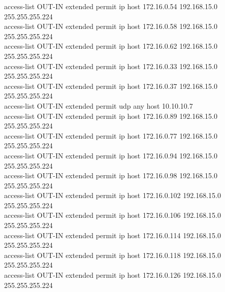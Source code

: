 \documentclass[12pt,a4paper]{report}
\begin{document}
{\hspace*{1cm}access-list OUT-IN extended permit ip host 172.16.0.54 192.168.15.0 255.255.255.224\\
\hspace*{1cm}access-list OUT-IN extended permit ip host 172.16.0.58 192.168.15.0 255.255.255.224\\
\hspace*{1cm}access-list OUT-IN extended permit ip host 172.16.0.62 192.168.15.0 255.255.255.224\\
\hspace*{1cm}access-list OUT-IN extended permit ip host 172.16.0.33 192.168.15.0 255.255.255.224\\
\hspace*{1cm}access-list OUT-IN extended permit ip host 172.16.0.37 192.168.15.0 255.255.255.224\\
\hspace*{1cm}access-list OUT-IN extended permit udp any host 10.10.10.7\\
\hspace*{1cm}access-list OUT-IN extended permit ip host 172.16.0.89 192.168.15.0 255.255.255.224\\
\hspace*{1cm}access-list OUT-IN extended permit ip host 172.16.0.77 192.168.15.0 255.255.255.224\\
\hspace*{1cm}access-list OUT-IN extended permit ip host 172.16.0.94 192.168.15.0 255.255.255.224\\
\hspace*{1cm}access-list OUT-IN extended permit ip host 172.16.0.98 192.168.15.0 255.255.255.224\\
\hspace*{1cm}access-list OUT-IN extended permit ip host 172.16.0.102 192.168.15.0 255.255.255.224\\
\hspace*{1cm}access-list OUT-IN extended permit ip host 172.16.0.106 192.168.15.0 255.255.255.224\\
\hspace*{1cm}access-list OUT-IN extended permit ip host 172.16.0.114 192.168.15.0 255.255.255.224\\
\hspace*{1cm}access-list OUT-IN extended permit ip host 172.16.0.118 192.168.15.0 255.255.255.224\\
\hspace*{1cm}access-list OUT-IN extended permit ip host 172.16.0.126 192.168.15.0 255.255.255.224\\
}
\end{document}
